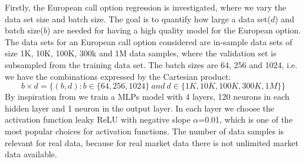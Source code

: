 Firstly, the European call option regression is investigated, where we vary the data set size and batch size. The goal is to quantify how large a data set($d$) and batch size($b$) are needed for having a high quality model for the European option. The data sets for an European call option considered are in-sample data sets of size 1K, 10K, 100K, 300k and 1M data samples, where the validation set is subsampled from the training data set. The batch sizes are 64, 256 and 1024, i.e. we have the combinations expressed by the Cartesian product:
$$b \times d = \{(b, d) : b \in \{64, 256, 1024\} \ and \ d \in\{1K,10K,100K,300K,1M \} \}$$
By inspiration from \parencite{HirsaAli2019} we train a MLPs model with 4 layers, 120 neurons in each hidden layer and 1 neuron in the output layer. In each layer we choose the activation function leaky ReLU with negative slope $\alpha$=0.01, which is one of the most popular choices for activation functions. The number of data samples is relevant for real data, because for real market data there is not unlimited market data available.\\

